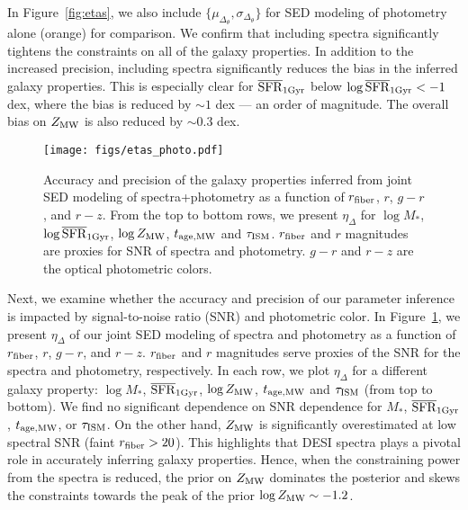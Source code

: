 In Figure~\ref{fig:etas}, we also include $\{\mu_{\Delta_{\theta}},
\sigma_{\Delta_{\theta}}\}$ for SED modeling of photometry alone (orange) for
comparison. 
We confirm that including spectra significantly tightens the constraints on all
of the galaxy properties. 
In addition to the increased precision, including spectra significantly
reduces the bias in the inferred galaxy properties. 
This is especially clear for $\overline{\rm SFR}_{\rm 1Gyr}$ below $\log\overline{\rm SFR}_{\rm 1Gyr} < -1$ dex, where the
bias is reduced by ${\sim}1$ dex --- an order of magnitude. 
The overall bias on $Z_{\rm MW}$ is also reduced by $\sim0.3$ dex. 

\begin{figure}
\begin{center}
    \texttt{[image: figs/etas\_photo.pdf]}
    \caption{
        Accuracy and precision of the galaxy properties inferred from joint SED
        modeling of spectra+photometry as a function of $r_{\rm fiber}$, $r$,
        $g-r$, and $r-z$.
        From the top to bottom rows, we present $\eta_\Delta$ for $\log M_*$,
        $\log\overline{\rm SFR}_{\rm 1Gyr}$, $\log Z_{\rm MW}$, $t_{\rm age, MW}$ and $\tau_{\rm ISM}$.
        $r_{\rm fiber}$ and $r$ magnitudes are proxies for SNR of spectra and
        photometry. 
        $g-r$ and $r-z$ are the optical photometric colors. 
    } 
    \label{fig:eta_photo}
\end{center}
\end{figure}


Next, we examine whether the accuracy and precision of our parameter inference
is impacted by signal-to-noise ratio (SNR) and photometric color. 
In Figure~\ref{fig:eta_photo}, we present $\eta_\Delta$ of our joint
SED modeling of spectra and photometry as a function of $r_{\rm fiber}$, $r$,
$g-r$, and $r-z$. 
$r_{\rm fiber}$ and $r$ magnitudes serve proxies of the SNR for the spectra and
photometry, respectively. 
In each row, we plot $\eta_\Delta$ for a different galaxy property: $\log M_*$,
$\overline{\rm SFR}_{\rm 1Gyr}$, $\log Z_{\rm MW}$, $t_{\rm age, MW}$ and $\tau_{\rm ISM}$ (from top to bottom).
We find no significant dependence on SNR dependence for $M_*$, $\overline{\rm SFR}_{\rm 1Gyr}$,
$t_{\rm age, MW}$, or $\tau_{\rm ISM}$. 
On the other hand, $Z_{\rm MW}$ is significantly overestimated at low spectral
SNR (faint $r_{\rm fiber} > 20$). 
This highlights that DESI spectra plays a pivotal role in accurately inferring
galaxy properties. 
Hence, when the constraining power from the spectra is reduced, the prior on 
$Z_{\rm MW}$ dominates the posterior and skews the constraints towards the peak
of the prior $\log Z_{\rm MW}\sim-1.2$. 

